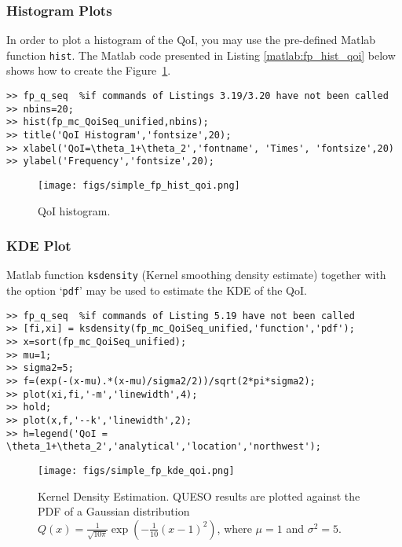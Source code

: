 \subsubsection{Histogram Plots}

In order to plot a histogram of the QoI, you may use the pre-defined Matlab function \verb+hist+.
The Matlab code presented in Listing \ref{matlab:fp_hist_qoi} below shows how to create the Figure~\ref{fig:fp_qoi_hist}.

\begin{lstlisting}[label=matlab:fp_hist_qoi,caption={Matlab code for the QoI histogram plot.}]
% inside Matlab
>> fp_q_seq  %if commands of Listings 3.19/3.20 have not been called
>> nbins=20;
>> hist(fp_mc_QoiSeq_unified,nbins);
>> title('QoI Histogram','fontsize',20);
>> xlabel('QoI=\theta_1+\theta_2','fontname', 'Times', 'fontsize',20)
>> ylabel('Frequency','fontsize',20);
\end{lstlisting}

\begin{figure}[p]
\centering
\texttt{[image: figs/simple\_fp\_hist\_qoi.png]}
\vspace{-10pt}
\caption{QoI histogram.}
\label{fig:fp_qoi_hist}
\end{figure}

\subsubsection{KDE Plot}

Matlab function \verb+ksdensity+ (Kernel smoothing density estimate) together with the option `\verb+pdf+' may be used to estimate the KDE of the QoI.

\begin{lstlisting}[label=matlab:fp_kde_qoi,caption={Matlab code for the KDE displayed in Figure \ref{fig:simple_sfp_kde}}]
% inside Matlab
>> fp_q_seq  %if commands of Listing 5.19 have not been called
>> [fi,xi] = ksdensity(fp_mc_QoiSeq_unified,'function','pdf');
>> x=sort(fp_mc_QoiSeq_unified);
>> mu=1;
>> sigma2=5;
>> f=(exp(-(x-mu).*(x-mu)/sigma2/2))/sqrt(2*pi*sigma2);
>> plot(xi,fi,'-m','linewidth',4);
>> hold;
>> plot(x,f,'--k','linewidth',2);
>> h=legend('QoI = \theta_1+\theta_2','analytical','location','northwest');
\end{lstlisting}


\begin{figure}[p]
\centering
\texttt{[image: figs/simple\_fp\_kde\_qoi.png]}
\vspace{-10pt}
\caption{Kernel Density Estimation. QUESO results are plotted against the PDF of a Gaussian distribution $Q(x)=   \frac{1}{ \sqrt{10\pi}} \exp\left(-\frac{1}{10}(x-1)^2 \right)$, where $\mu=1$ and $\sigma^2=5$.}
\label{fig:simple_sfp_kde}
\end{figure}


